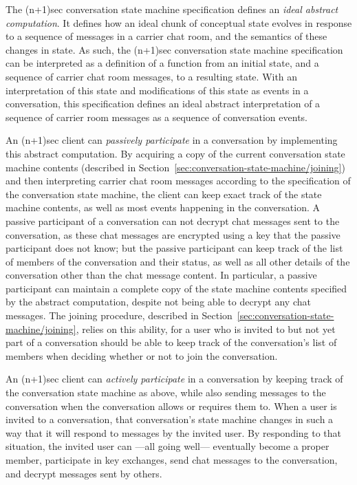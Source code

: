 \documentclass{article}
\begin{document}
The (n+1)sec conversation state machine specification defines an \emph{ideal abstract computation}.
It defines how an ideal chunk of conceptual state evolves in response to a sequence of messages in a carrier chat room, and the semantics of these changes in state.
As such, the (n+1)sec conversation state machine specification can be interpreted as a definition of a function from an initial state, and a sequence of carrier chat room messages, to a resulting state.
With an interpretation of this state and modifications of this state as events in a conversation, this specification defines an ideal abstract interpretation of a sequence of carrier room messages as a sequence of conversation events.

An (n+1)sec client can \emph{passively participate} in a conversation by implementing this abstract computation.
By acquiring a copy of the current conversation state machine contents (described in Section~\ref{sec:conversation-state-machine/joining}) and then interpreting carrier chat room messages according to the specification of the conversation state machine, the client can keep exact track of the state machine contents, as well as most events happening in the conversation.
A passive participant of a conversation can not decrypt chat messages sent to the conversation, as these chat messages are encrypted using a key that the passive participant does not know; but the passive participant can keep track of the list of members of the conversation and their status, as well as all other details of the conversation other than the chat message content.
In particular, a passive participant can maintain a complete copy of the state machine contents specified by the abstract computation, despite not being able to decrypt any chat messages.
The joining procedure, described in Section~\ref{sec:conversation-state-machine/joining}, relies on this ability, for a user who is invited to but not yet part of a conversation should be able to keep track of the conversation's list of members when deciding whether or not to join the conversation.

An (n+1)sec client can \emph{actively participate} in a conversation by keeping track of the conversation state machine as above, while also sending messages to the conversation when the conversation allows or requires them to.
When a user is invited to a conversation, that conversation's state machine changes in such a way that it will respond to messages by the invited user.
By responding to that situation, the invited user can ---all going well--- eventually become a proper member, participate in key exchanges, send chat messages to the conversation, and decrypt messages sent by others.
\end{document}
